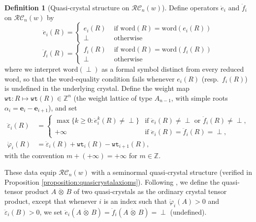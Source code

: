 \documentclass{amsart}
\theoremstyle{definition}
\newtheorem{definition}[lemma]{Definition}
\theoremstyle{remark}
\numberwithin{equation}{subsection}
\newcommand{\wtt}{\mathtt{wt}}
\newcommand{\RC}{\mathcal{RC}}
\begin{document}
\begin{definition}[Quasi-crystal structure on $\RC_n(w)$]\label{definition:quasicrystal}
Define operators $\ddot{e}_i$ and $\ddot{f}_i$ on $\RC_n(w)$ by
$$\ddot{e}_i(R) = \begin{cases}
  e_i(R) & \text{ if }\mathrm{word}(R) = \mathrm{word}(e_i(R))\\
  \perp & \text{ otherwise}
\end{cases}$$
$$\ddot{f}_i(R) = \begin{cases}
  f_i(R) & \text{ if }\mathrm{word}(R) = \mathrm{word}(f_i(R))\\
  \perp & \text{ otherwise}
\end{cases}$$
where we interpret $\mathrm{word}(\perp)$ as a formal symbol distinct from every reduced word, so that the word-equality condition fails whenever $e_i(R)$ (resp.\ $f_i(R)$) is undefined in the underlying crystal. Define the weight map $\wtt:R\mapsto\wtt(R)\in\mathbb{Z}^n$ (the weight lattice of type $A_{n-1}$, with simple roots $\alpha_i=\mathbf{e}_i-\mathbf{e}_{i+1}$), and set
\begin{align*}
\ddot{\varepsilon}_i(R) &= \begin{cases}\max\{k\geq 0:\ddot{e}_i^k(R)\neq\perp\}&\text{if }\ddot{e}_i(R)\neq\perp\text{ or }\ddot{f}_i(R)\neq\perp,\\ +\infty &\text{if }\ddot{e}_i(R)=\ddot{f}_i(R)=\perp,\end{cases}\\
\ddot{\varphi}_i(R) &= \ddot{\varepsilon}_i(R) + \wtt_i(R)-\wtt_{i+1}(R),
\end{align*}
with the convention $m+(+\infty)=+\infty$ for $m\in\mathbb{Z}$.

These data equip $\RC_n(w)$ with a seminormal quasi-crystal structure (verified in Proposition \ref{proposition:quasicrystalaxioms}). Following \cite{cain2023quasicrystals}, we define the quasi-tensor product $A\,\ddot{\otimes}\,B$ of two quasi-crystals as the ordinary crystal tensor product, except that whenever $i$ is an index such that $\ddot{\varphi}_i(A)>0$ and $\ddot{\varepsilon}_i(B)>0$, we set $\ddot{e}_i(A\,\ddot{\otimes}\,B)=\ddot{f}_i(A\,\ddot{\otimes}\,B)=\perp$ (undefined).
\end{definition}
\end{document}
